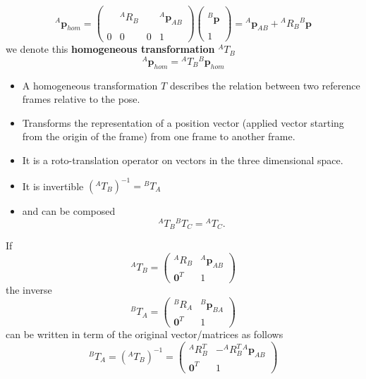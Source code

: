 \documentclass[10pt, letterpaper]{report}
\begin{document}
\begin{equation}
     {}^A\mathbf p_{hom}=\begin{pmatrix}
        & & & \\ 
        &{}^AR_B & & {}^A\mathbf p_{AB} \\ 
        & & & \\
        0&0 &0 & 1
     \end{pmatrix}\begin{pmatrix}
        \\ {}^B\mathbf p \\ \\ 1 
    \end{pmatrix}={}^A\mathbf p_{AB}+{}^AR_B{}^B\mathbf p
\end{equation}
we denote this \textbf{homogeneous transformation} ${}^AT_B$\begin{equation}
     {}^A\mathbf p_{hom}={}^AT_B{}^B\mathbf p_{hom}
\end{equation}\begin{itemize}
    \item A homogeneous transformation $T$ describes the relation between two reference frames relative to the pose.
    \item Transforms the representation of a position vector
(applied vector starting from the origin of the frame)
from one frame to another frame.
\item It is a roto-translation operator on vectors in the three dimensional space. 
\item It is invertible $({}^AT_B)^{-1}={}^BT_A$
\item and can be composed\begin{equation}
    {}^AT_B{}^BT_C={}^AT_C.
\end{equation}
\end{itemize}
If $${}^AT_B=\begin{pmatrix}
    {}^AR_B&{}^A\mathbf p_{AB}\\ 
    \mathbf 0^T&1
\end{pmatrix}$$
the inverse 
$${}^BT_A=\begin{pmatrix}
    {}^BR_A&{}^B\mathbf p_{BA}\\ 
    \mathbf 0^T&1
\end{pmatrix}$$
can be written in term of the original vector/matrices as follows\begin{equation}
    {}^BT_A=({}^AT_B)^{-1}=\begin{pmatrix}
    {}^AR_B^T&-{}^AR_B^T{}^A\mathbf p_{AB}\\ 
    \mathbf 0^T&1
\end{pmatrix}
\end{equation}
\end{document}

